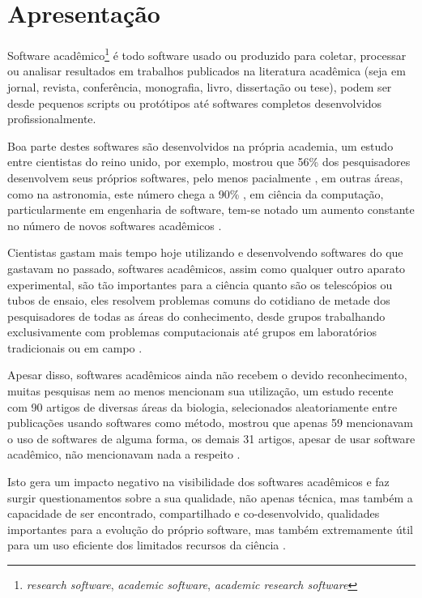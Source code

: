 
\section{Apresentação}

Software acadêmico\footnote{{\it research software}, {\it academic software},
{\it academic research software}} é todo software usado ou produzido para
coletar, processar ou analisar resultados em trabalhos publicados na literatura
acadêmica (seja em jornal, revista, conferência, monografia, livro, dissertação
ou tese), podem ser desde pequenos scripts ou protótipos até softwares
completos desenvolvidos profissionalmente.

Boa parte destes softwares são desenvolvidos na própria academia, um estudo
entre cientistas do reino unido, por exemplo, mostrou que 56\% dos
pesquisadores desenvolvem seus próprios softwares, pelo menos pacialmente
\cite{hettrick_2014_14809}, em outras áreas, como na astronomia, este número
chega a 90\% \cite{momcheva2015software}, em ciência da computação,
particularmente em engenharia de software, tem-se notado um aumento constante
no número de novos softwares acadêmicos \cite{allen2017engineering}.

Cientistas gastam mais tempo hoje utilizando e desenvolvendo softwares do que
gastavam no passado, softwares acadêmicos, assim como qualquer outro aparato
experimental, são tão importantes para a ciência quanto são os telescópios ou
tubos de ensaio, eles resolvem problemas comuns do cotidiano de metade dos
pesquisadores de todas as áreas do conhecimento, desde grupos trabalhando
exclusivamente com problemas computacionais até grupos em laboratórios
tradicionais ou em campo \cite{wilson2014best}.

Apesar disso, softwares acadêmicos ainda não recebem o devido reconhecimento,
muitas pesquisas nem ao menos mencionam sua utilização, um estudo recente com
90 artigos de diversas áreas da biologia, selecionados aleatoriamente entre
publicações usando softwares como método, mostrou que apenas 59 mencionavam o
uso de softwares de alguma forma, os demais 31 artigos, apesar de usar software
acadêmico, não mencionavam nada a respeito \cite{howison2016software}.

Isto gera um impacto negativo na visibilidade dos softwares acadêmicos e faz
surgir questionamentos sobre a sua qualidade, não apenas técnica, mas também a
capacidade de ser encontrado, compartilhado e co-desenvolvido, qualidades
importantes para a evolução do próprio software, mas também extremamente útil
para um uso eficiente dos limitados recursos da ciência \cite{howison2013,
katz2014transitive}.

